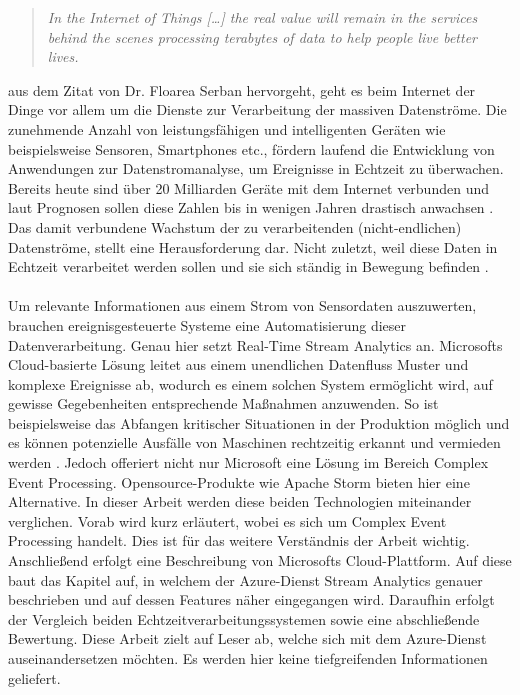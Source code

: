 
\begin{quote} \textit{\glqq In the Internet of Things […] the real value will remain in the services behind the scenes processing terabytes of data to help people live better lives. \grqq~}\cite{Floarea.2014}\\ \end{quote} 

 aus dem Zitat von Dr. Floarea Serban hervorgeht, geht es beim Internet der Dinge vor allem um die Dienste zur Verarbeitung der massiven Datenströme. Die zunehmende Anzahl von leistungsfähigen und intelligenten Geräten wie beispielsweise Sensoren, Smartphones etc., fördern laufend die Entwicklung von Anwendungen zur Datenstromanalyse, um Ereignisse in Echtzeit zu überwachen. Bereits heute sind über 20 Milliarden Geräte mit dem Internet verbunden und laut Prognosen sollen diese Zahlen bis in wenigen Jahren drastisch anwachsen \cite{Statista.2017}. Das damit verbundene Wachstum der zu verarbeitenden (nicht-endlichen) Datenströme, stellt eine Herausforderung dar. Nicht zuletzt, weil diese Daten in Echtzeit verarbeitet werden sollen und sie sich ständig in Bewegung befinden \cite{Prosise.}.\\ \\  
Um relevante Informationen aus einem Strom von Sensordaten auszuwerten, brauchen ereignisgesteuerte Systeme eine Automatisierung dieser Datenverarbeitung. Genau hier setzt Real-Time Stream Analytics an. Microsofts Cloud-basierte Lösung leitet aus einem unendlichen Datenfluss Muster und komplexe Ereignisse ab, wodurch es einem solchen System ermöglicht wird, auf gewisse Gegebenheiten entsprechende Maßnahmen anzuwenden. So ist beispielsweise das Abfangen kritischer Situationen in der Produktion möglich und es können potenzielle Ausfälle von Maschinen rechtzeitig erkannt und vermieden werden \cite{rcrwireless.2016}. Jedoch offeriert nicht nur Microsoft eine Lösung im Bereich Complex Event Processing. Opensource-Produkte wie Apache Storm bieten hier eine Alternative. In dieser Arbeit werden diese beiden Technologien miteinander verglichen. Vorab wird kurz erläutert, wobei es sich um Complex Event Processing handelt. Dies ist für das weitere Verständnis der Arbeit wichtig. Anschließend erfolgt eine Beschreibung von Microsofts Cloud-Plattform. Auf diese baut das Kapitel auf, in welchem der Azure-Dienst Stream Analytics genauer beschrieben und auf dessen Features näher eingegangen wird. Daraufhin erfolgt der Vergleich beiden Echtzeitverarbeitungssystemen sowie eine abschließende Bewertung. Diese Arbeit zielt auf Leser ab, welche sich mit dem Azure-Dienst auseinandersetzen möchten. Es werden hier keine tiefgreifenden Informationen geliefert.\\ \\
